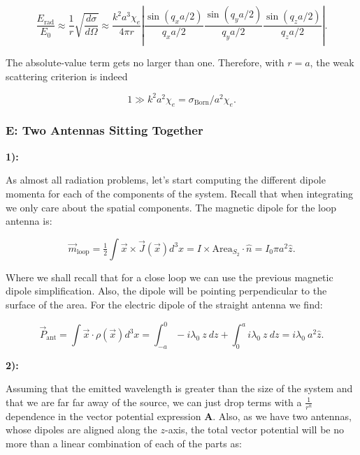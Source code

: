\begin{equation}
	\frac{E_{\mathrm{rad}}}{E_{0}} \approx \frac{1}{r} \sqrt{\frac{d \sigma}{d \Omega}} \approx \frac{k^{2} a^{3} \chi_{e}}{4 \pi r}\left|\frac{\sin \left(q_{x} a / 2\right)}{q_{x} a / 2} \frac{\sin \left(q_{y} a / 2\right)}{q_{y} a / 2} \frac{\sin \left(q_{z} a / 2\right)}{q_{z} a / 2}\right|.
\end{equation}

The absolute-value term gets no larger than one. Therefore, with $r=a$, the weak scattering criterion is indeed

\begin{equation}
	1 \gg k^{2} a^{2} \chi_{e}=\sigma_{\mathrm{Born}} / a^{2} \chi_{e}.
\end{equation}

\subsubsection{E: Two Antennas Sitting Together}\label{E: Two Antennas Sitting Together}

\textbf{1):}

As almost all radiation problems, let's start computing the different dipole momenta for each of the components of the system. Recall that when integrating we only care about the spatial components. The magnetic dipole for the loop antenna is:

\begin{equation}
	\vec{m}_{\mathrm{loop}} = \tfrac{1}{2} \int \vec{x}\times \vec{J}(\vec{x}) d^{3} x = I \times \text{Area}_{S_{2}} \cdot \hat{n} = I_{0} \pi a^{2} \hat{z}.
\end{equation}

Where we shall recall that for a close loop we can use the previous magnetic dipole simplification. Also, the dipole will be pointing perpendicular to the surface of the area. For the electric dipole of the straight antenna we find:

\begin{equation}
	\vec{P}_{\mathrm{ant}} = \int \vec{x}\cdot \rho (\vec{x})d^{3}x = \int^{0}_{-a}  -i\lambda_{0}\: z \: dz + \int^{a}_{0} i\lambda_{0} \:  z \: dz = i\lambda_{0}\: a^{2} \hat{z}.
\end{equation}

\textbf{2):}

Assuming that the emitted wavelength is greater than the size of the system and that we are far far away of the source, we can just drop terms with a $\tfrac{1}{r^{n}}$ dependence in the vector potential expression $\mathbf{A}$. Also, as we have two antennas, whose dipoles are aligned along the $z$-axis, the total vector potential will be no more than a linear combination of each of the parts as:

